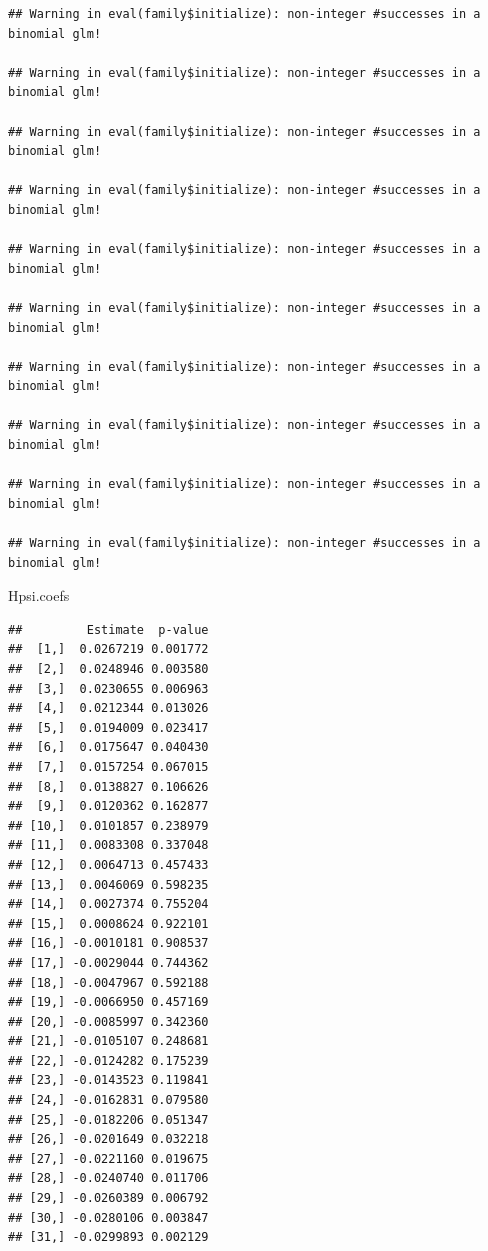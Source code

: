 \documentclass[
  10pt,
]{book}
\newenvironment{Shaded}{\begin{snugshade}}{\end{snugshade}}
\newcommand{\NormalTok}[1]{#1}
\begin{document}
\begin{verbatim}
## Warning in eval(family$initialize): non-integer #successes in a binomial glm!

## Warning in eval(family$initialize): non-integer #successes in a binomial glm!

## Warning in eval(family$initialize): non-integer #successes in a binomial glm!

## Warning in eval(family$initialize): non-integer #successes in a binomial glm!

## Warning in eval(family$initialize): non-integer #successes in a binomial glm!

## Warning in eval(family$initialize): non-integer #successes in a binomial glm!

## Warning in eval(family$initialize): non-integer #successes in a binomial glm!

## Warning in eval(family$initialize): non-integer #successes in a binomial glm!

## Warning in eval(family$initialize): non-integer #successes in a binomial glm!

## Warning in eval(family$initialize): non-integer #successes in a binomial glm!
\end{verbatim}

\begin{Shaded}
\begin{Highlighting}[]
\NormalTok{Hpsi.coefs}
\end{Highlighting}
\end{Shaded}

\begin{verbatim}
##         Estimate  p-value
##  [1,]  0.0267219 0.001772
##  [2,]  0.0248946 0.003580
##  [3,]  0.0230655 0.006963
##  [4,]  0.0212344 0.013026
##  [5,]  0.0194009 0.023417
##  [6,]  0.0175647 0.040430
##  [7,]  0.0157254 0.067015
##  [8,]  0.0138827 0.106626
##  [9,]  0.0120362 0.162877
## [10,]  0.0101857 0.238979
## [11,]  0.0083308 0.337048
## [12,]  0.0064713 0.457433
## [13,]  0.0046069 0.598235
## [14,]  0.0027374 0.755204
## [15,]  0.0008624 0.922101
## [16,] -0.0010181 0.908537
## [17,] -0.0029044 0.744362
## [18,] -0.0047967 0.592188
## [19,] -0.0066950 0.457169
## [20,] -0.0085997 0.342360
## [21,] -0.0105107 0.248681
## [22,] -0.0124282 0.175239
## [23,] -0.0143523 0.119841
## [24,] -0.0162831 0.079580
## [25,] -0.0182206 0.051347
## [26,] -0.0201649 0.032218
## [27,] -0.0221160 0.019675
## [28,] -0.0240740 0.011706
## [29,] -0.0260389 0.006792
## [30,] -0.0280106 0.003847
## [31,] -0.0299893 0.002129
\end{verbatim}
\end{document}

